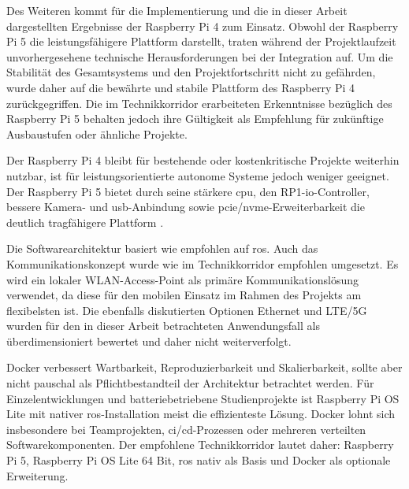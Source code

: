 Des Weiteren kommt für die Implementierung und die in dieser Arbeit dargestellten Ergebnisse der Raspberry Pi 4 zum Einsatz. Obwohl der Raspberry Pi 5 die leistungsfähigere Plattform darstellt, traten während der Projektlaufzeit unvorhergesehene technische Herausforderungen bei der Integration auf. Um die Stabilität des Gesamtsystems und den Projektfortschritt nicht zu gefährden, wurde daher auf die bewährte und stabile Plattform des Raspberry Pi 4 zurückgegriffen. Die im Technikkorridor erarbeiteten Erkenntnisse bezüglich des Raspberry Pi 5 behalten jedoch ihre Gültigkeit als Empfehlung für zukünftige Ausbaustufen oder ähnliche Projekte.

Der Raspberry Pi 4 bleibt für bestehende oder kostenkritische Projekte weiterhin nutzbar, ist für leistungsorientierte autonome Systeme jedoch weniger geeignet. Der Raspberry Pi 5 bietet durch seine stärkere \gls{cpu}, den RP1-\gls{io}-Controller, bessere Kamera- und \gls{usb}-Anbindung sowie \gls{pcie}/\gls{nvme}-Erweiterbarkeit die deutlich tragfähigere Plattform \cite[Abschnitte ``Overview'' und ``Specification'']{zotero-item-144} \cite[Abschnitte ``Performance'' sowie ``PCI, Cameras, Displays\ldots'']{zotero-item-147}.

Die Softwarearchitektur basiert wie empfohlen auf \gls{ros}. Auch das Kommunikationskonzept wurde wie im Technikkorridor empfohlen umgesetzt. Es wird ein lokaler WLAN-Access-Point als primäre Kommunikationslösung verwendet, da diese für den mobilen Einsatz im Rahmen des Projekts am flexibelsten ist. Die ebenfalls diskutierten Optionen Ethernet und LTE/5G wurden für den in dieser Arbeit betrachteten Anwendungsfall als überdimensioniert bewertet und daher nicht weiterverfolgt.

Docker verbessert Wartbarkeit, Reproduzierbarkeit und Skalierbarkeit, sollte aber nicht pauschal als Pflichtbestandteil der Architektur betrachtet werden. Für Einzelentwicklungen und batteriebetriebene Studienprojekte ist Raspberry Pi OS Lite mit nativer \gls{ros}-Installation meist die effizienteste Lösung. Docker lohnt sich insbesondere bei Teamprojekten, \gls{ci/cd}-Prozessen oder mehreren verteilten Softwarekomponenten. Der empfohlene Technikkorridor lautet daher: Raspberry Pi 5, Raspberry Pi OS Lite 64 Bit, \gls{ros} nativ als Basis und Docker als optionale Erweiterung.